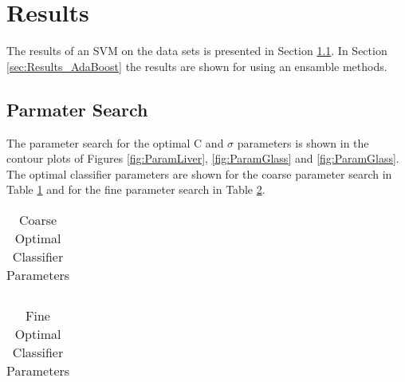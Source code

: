 \section{Results}
\label{sec:Results}

The results of an SVM on the data sets is presented in Section \ref{sec:Results_ParamSearch}.
In Section \ref{sec:Results_AdaBoost} the results are shown for using an ensamble methods.

\subsection{Parmater Search}
\label{sec:Results_ParamSearch}

The parameter search for the optimal C and $\sigma$ parameters is shown in the contour plots of Figures \ref{fig:ParamLiver}, \ref{fig:ParamGlass} and \ref{fig:ParamGlass}.
The optimal classifier parameters are shown for the coarse parameter search in Table \ref{tab:CoarseParamValues} and for the fine parameter search in Table \ref{tab:FineParamValues}.
\begin{table}[h!]
\caption{Coarse Optimal Classifier Parameters}
\label{tab:CoarseParamValues}
\centering
\begin{tabular}{c c c c c c c c}
\hline

\hline
\end{tabular}
\end{table}
\begin{table}[!ht]
\caption{Fine Optimal Classifier Parameters}
\label{tab:FineParamValues}
\centering
\begin{tabular}{c c c c c c c c}
\hline

\hline
\end{tabular}
\end{table}
